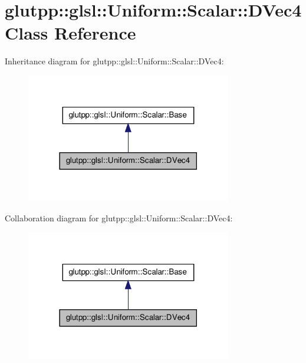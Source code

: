 \hypertarget{classglutpp_1_1glsl_1_1Uniform_1_1Scalar_1_1DVec4}{\section{glutpp\-:\-:glsl\-:\-:\-Uniform\-:\-:\-Scalar\-:\-:\-D\-Vec4 \-Class \-Reference}
\label{classglutpp_1_1glsl_1_1Uniform_1_1Scalar_1_1DVec4}
}


\-Inheritance diagram for glutpp\-:\-:glsl\-:\-:\-Uniform\-:\-:\-Scalar\-:\-:\-D\-Vec4\-:
\nopagebreak
\begin{figure}[H]
\begin{center}
\leavevmode
\includegraphics[width=254pt]{classglutpp_1_1glsl_1_1Uniform_1_1Scalar_1_1DVec4__inherit__graph}
\end{center}
\end{figure}


\-Collaboration diagram for glutpp\-:\-:glsl\-:\-:\-Uniform\-:\-:\-Scalar\-:\-:\-D\-Vec4\-:
\nopagebreak
\begin{figure}[H]
\begin{center}
\leavevmode
\includegraphics[width=254pt]{classglutpp_1_1glsl_1_1Uniform_1_1Scalar_1_1DVec4__coll__graph}
\end{center}
\end{figure}
